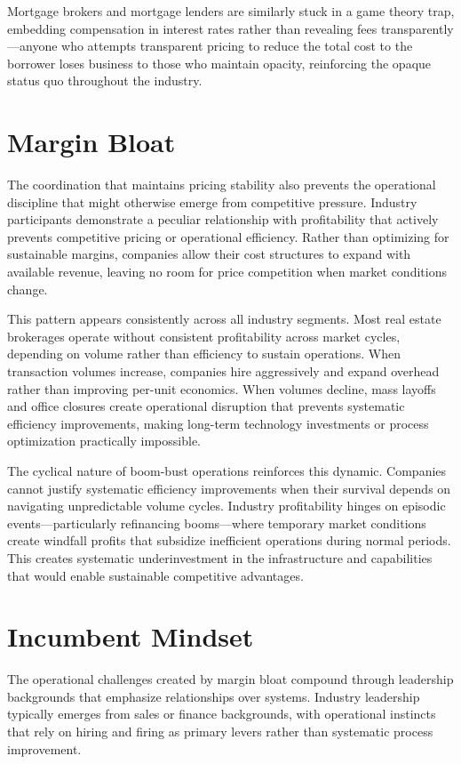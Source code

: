 Mortgage brokers and mortgage lenders are similarly stuck in a game theory trap, embedding compensation in interest rates rather than revealing fees transparently---anyone who attempts transparent pricing to reduce the total cost to the borrower loses business to those who maintain opacity, reinforcing the opaque status quo throughout the industry.

\section{Margin Bloat}

The coordination that maintains pricing stability also prevents the operational discipline that might otherwise emerge from competitive pressure. Industry participants demonstrate a peculiar relationship with profitability that actively prevents competitive pricing or operational efficiency. Rather than optimizing for sustainable margins, companies allow their cost structures to expand with available revenue, leaving no room for price competition when market conditions change.

This pattern appears consistently across all industry segments. Most real estate brokerages operate without consistent profitability across market cycles, depending on volume rather than efficiency to sustain operations. When transaction volumes increase, companies hire aggressively and expand overhead rather than improving per-unit economics. When volumes decline, mass layoffs and office closures create operational disruption that prevents systematic efficiency improvements, making long-term technology investments or process optimization practically impossible.

The cyclical nature of boom-bust operations reinforces this dynamic. Companies cannot justify systematic efficiency improvements when their survival depends on navigating unpredictable volume cycles. Industry profitability hinges on episodic events---particularly refinancing booms---where temporary market conditions create windfall profits that subsidize inefficient operations during normal periods. This creates systematic underinvestment in the infrastructure and capabilities that would enable sustainable competitive advantages.

\section{Incumbent Mindset}

The operational challenges created by margin bloat compound through leadership backgrounds that emphasize relationships over systems. Industry leadership typically emerges from sales or finance backgrounds, with operational instincts that rely on hiring and firing as primary levers rather than systematic process improvement.

